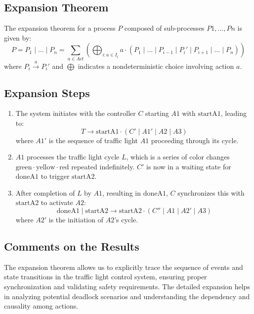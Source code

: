 \documentclass{article}
\begin{document}
\subsection{Expansion Theorem}

The expansion theorem for a process $P$ composed of sub-processes $P1, \ldots, Pn$ is given by:
\[
P = P_1 \mid \dots \mid P_n = \sum_{a \in Act} \left( \bigoplus_{i : a \in I_i} a \cdot (P_1 \mid \dots \mid P_{i-1} \mid P_i' \mid P_{i+1} \mid \dots \mid P_n) \right)
\]
where $P_i \overset{a}{\longrightarrow} P_i'$ and $\bigoplus$ indicates a nondeterministic choice involving action $a$.


\subsection{Expansion Steps}

\begin{enumerate}
    \item The system initiates with the controller \( C \) starting \( A1 \) with \( \text{startA1} \), leading to:
    \[ T \rightarrow \text{startA1} \cdot (C' \mid A1' \mid A2 \mid A3) \]
    where \( A1' \) is the sequence of traffic light \( A1 \) proceeding through its cycle.

    \item \( A1 \) processes the traffic light cycle \( L \), which is a series of color changes \( \text{green} \cdot \text{yellow} \cdot \text{red} \) repeated indefinitely. \( C' \) is now in a waiting state for \( \text{doneA1} \) to trigger \( \text{startA2} \).

    \item After completion of \( L \) by \( A1 \), resulting in \( \text{doneA1} \), \( C \) synchronizes this with \( \text{startA2} \) to activate \( A2 \):
    \[ \text{doneA1} \mid \text{startA2} \rightarrow \text{startA2} \cdot (C'' \mid A1 \mid A2' \mid A3) \]
    where \( A2' \) is the initiation of \( A2 \)'s cycle.
\end{enumerate}



\subsection{Comments on the Results}

The expansion theorem allows us to explicitly trace the sequence of events and state transitions in the traffic light control system, ensuring proper synchronization and validating safety requirements. The detailed expansion helps in analyzing potential deadlock scenarios and understanding the dependency and causality among actions.
\end{document}

